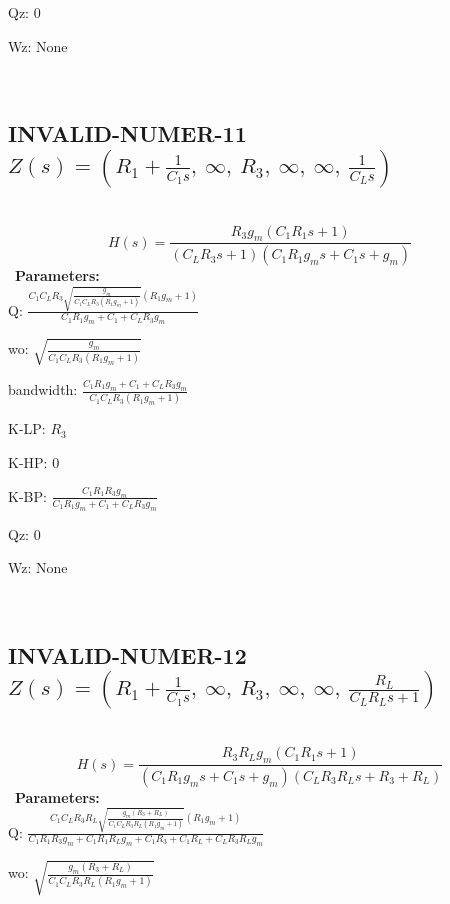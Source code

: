 \documentclass{article}
\begin{document}
Qz: $0$\ 

Wz: $\text{None}$\ 

\ 

\subsection{INVALID-NUMER-11 $Z(s) = \left( R_{1} + \frac{1}{C_{1} s}, \  \infty, \  R_{3}, \  \infty, \  \infty, \  \frac{1}{C_{L} s}\right)$ } \ 
\textbf{\[H(s) = \frac{R_{3} g_{m} \left(C_{1} R_{1} s + 1\right)}{\left(C_{L} R_{3} s + 1\right) \left(C_{1} R_{1} g_{m} s + C_{1} s + g_{m}\right)}\] } \ 
\textbf{Parameters:}\\ 

Q: $\frac{C_{1} C_{L} R_{3} \sqrt{\frac{g_{m}}{C_{1} C_{L} R_{3} \left(R_{1} g_{m} + 1\right)}} \left(R_{1} g_{m} + 1\right)}{C_{1} R_{1} g_{m} + C_{1} + C_{L} R_{3} g_{m}}$\ 

wo: $\sqrt{\frac{g_{m}}{C_{1} C_{L} R_{3} \left(R_{1} g_{m} + 1\right)}}$\ 

bandwidth: $\frac{C_{1} R_{1} g_{m} + C_{1} + C_{L} R_{3} g_{m}}{C_{1} C_{L} R_{3} \left(R_{1} g_{m} + 1\right)}$\ 

K-LP: $R_{3}$\ 

K-HP: $0$\ 

K-BP: $\frac{C_{1} R_{1} R_{3} g_{m}}{C_{1} R_{1} g_{m} + C_{1} + C_{L} R_{3} g_{m}}$\ 

Qz: $0$\ 

Wz: $\text{None}$\ 

\ 

\subsection{INVALID-NUMER-12 $Z(s) = \left( R_{1} + \frac{1}{C_{1} s}, \  \infty, \  R_{3}, \  \infty, \  \infty, \  \frac{R_{L}}{C_{L} R_{L} s + 1}\right)$ } \ 
\textbf{\[H(s) = \frac{R_{3} R_{L} g_{m} \left(C_{1} R_{1} s + 1\right)}{\left(C_{1} R_{1} g_{m} s + C_{1} s + g_{m}\right) \left(C_{L} R_{3} R_{L} s + R_{3} + R_{L}\right)}\] } \ 
\textbf{Parameters:}\\ 

Q: $\frac{C_{1} C_{L} R_{3} R_{L} \sqrt{\frac{g_{m} \left(R_{3} + R_{L}\right)}{C_{1} C_{L} R_{3} R_{L} \left(R_{1} g_{m} + 1\right)}} \left(R_{1} g_{m} + 1\right)}{C_{1} R_{1} R_{3} g_{m} + C_{1} R_{1} R_{L} g_{m} + C_{1} R_{3} + C_{1} R_{L} + C_{L} R_{3} R_{L} g_{m}}$\ 

wo: $\sqrt{\frac{g_{m} \left(R_{3} + R_{L}\right)}{C_{1} C_{L} R_{3} R_{L} \left(R_{1} g_{m} + 1\right)}}$\ 
\end{document}
